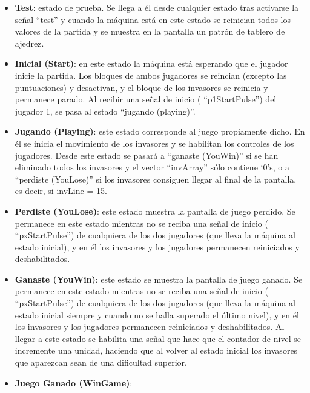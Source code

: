 \begin{itemize}
	\item {\bfseries Test}: estado de prueba. Se llega a él desde cualquier estado tras activarse la señal ``test'' y cuando la máquina está en este estado se reinician todos los valores de la partida y se muestra en la pantalla un patrón de tablero de ajedrez.
	\item {\bfseries Inicial (Start)}: en este estado la máquina está esperando que el jugador inicie la partida. Los bloques de ambos jugadores se reincian (excepto las puntuaciones) y desactivan, y el bloque de los invasores se reinicia y permanece parado. Al recibir una señal de inicio ( ``p1StartPulse'') del jugador 1, se pasa al estado ``jugando (playing)''.	
	\item {\bfseries Jugando (Playing)}: este estado corresponde al juego propiamente dicho. En él se inicia el movimiento de los invasores y se habilitan los controles de los jugadores. Desde este estado se pasará a ``ganaste (YouWin)'' si se han eliminado todos los invasores y el vector ``invArray'' sólo contiene `0's, o a ``perdiste (YouLose)'' si los invasores consiguen llegar al final de la pantalla, es decir, si invLine = 15.
	\item {\bfseries Perdiste (YouLose)}: este estado muestra la pantalla de juego perdido. Se permanece en este estado mientras no se reciba una señal de inicio ( ``pxStartPulse'') de cualquiera de los dos jugadores (que lleva la máquina al estado inicial), y en él los invasores y los jugadores permanecen reiniciados y deshabilitados.
	\item {\bfseries Ganaste (YouWin)}: este estado se muestra la pantalla de juego ganado. Se permanece en este estado mientras no se reciba una señal de inicio ( ``pxStartPulse'') de cualquiera de los dos jugadores (que lleva la máquina al estado inicial siempre y cuando no se halla superado el último nivel), y en él los invasores y los jugadores permanecen reiniciados y deshabilitados. Al llegar a este estado se habilita una señal que hace que el contador de nivel se incremente una unidad, haciendo que al volver al estado inicial los invasores que aparezcan sean de una dificultad superior.
	\item {\bfseries Juego Ganado (WinGame)}: 
	
\end{itemize}